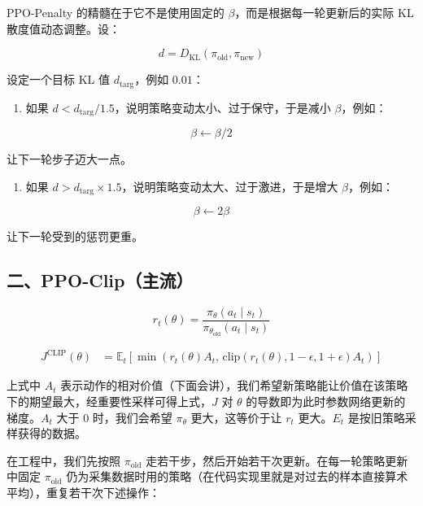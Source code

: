 PPO-Penalty 的精髓在于它不是使用固定的 \(\beta\)，而是根据每一轮更新后的实际 KL 散度值动态调整。设：

\[
d = D_{\mathrm{KL}}(\pi_{\mathrm{old}},\pi_{\mathrm{new}})
\]

设定一个目标 KL 值 \(d_{\mathrm{targ}}\)，例如 \(0.01\)：

\begin{enumerate}
\def\labelenumi{\arabic{enumi}.}
\tightlist
\item
  如果 \(d < d_{\mathrm{targ}}/1.5\)，说明策略变动太小、过于保守，于是减小 \(\beta\)，例如：
\end{enumerate}

\[
\beta \leftarrow \beta/2
\]

让下一轮步子迈大一点。

\begin{enumerate}
\def\labelenumi{\arabic{enumi}.}
\setcounter{enumi}{1}
\tightlist
\item
  如果 \(d > d_{\mathrm{targ}}\times 1.5\)，说明策略变动太大、过于激进，于是增大 \(\beta\)，例如：
\end{enumerate}

\[
\beta \leftarrow 2\beta
\]

让下一轮受到的惩罚更重。

\hypertarget{ux4e8cppo-clipux4e3bux6d41}{%
\subsection{二、PPO-Clip（主流）}\label{ux4e8cppo-clipux4e3bux6d41}}

\[
r_t(\theta)=\frac{\pi_\theta(a_t\mid s_t)}{\pi_{\theta_{\mathrm{old}}}(a_t\mid s_t)}
\]

\[
\begin{aligned}
J^{\mathrm{CLIP}}(\theta)
&=
\mathbb{E}_t\left[
\min\left(
r_t(\theta)A_t,\,
\mathrm{clip}(r_t(\theta),1-\epsilon,1+\epsilon)A_t
\right)
\right]
\end{aligned}
\]

上式中 \(A_t\) 表示动作的相对价值（下面会讲），我们希望新策略能让价值在该策略下的期望最大，经重要性采样可得上式，\(J\) 对 \(\theta\) 的导数即为此时参数网络更新的梯度。\(A_t\) 大于 \(0\) 时，我们会希望 \(\pi_\theta\) 更大，这等价于让 \(r_t\) 更大。\(E_t\) 是按旧策略采样获得的数据。

在工程中，我们先按照 \(\pi_{\mathrm{old}}\) 走若干步，然后开始若干次更新。在每一轮策略更新中固定 \(\pi_{\mathrm{old}}\) 仍为采集数据时用的策略（在代码实现里就是对过去的样本直接算术平均），重复若干次下述操作：


